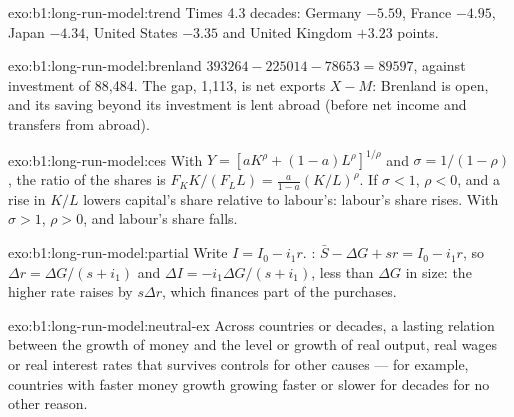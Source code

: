\begin{solution}{exo:b1:long-run-model:trend}
Times 4.3 decades: Germany $-5.59$, France $-4.95$, Japan $-4.34$, United States
$-3.35$ and United Kingdom $+3.23$ points.
\end{solution}

\begin{solution}{exo:b1:long-run-model:brenland}
$393264 - 225014 - 78653 = 89597$, against investment of 88,484. The gap, 1,113, is
net exports $X - M$: Brenland is open, and its saving beyond its investment
is lent abroad (before net income and transfers from abroad).
\end{solution}

\begin{solution}{exo:b1:long-run-model:ces}
With $Y = [aK^{\rho} + (1 - a)L^{\rho}]^{1/\rho}$ and $\sigma = 1/(1 - \rho)$, the ratio of the shares is
$F_K K/(F_L L) = \frac{a}{1 - a}(K/L)^{\rho}$. If $\sigma < 1$, $\rho < 0$, and a rise in $K/L$ lowers capital's
share relative to labour's: labour's share rises. With $\sigma > 1$, $\rho > 0$, and
labour's share falls.
\end{solution}

\begin{solution}{exo:b1:long-run-model:partial}
Write $I = I_0 - i_1r$. : $\bar S - \Delta G + sr = I_0 - i_1r$, so $\Delta r = \Delta G/(s + i_1)$
and $\Delta I = -i_1\Delta G/(s + i_1)$, less than $\Delta G$ in size: the higher rate raises  by $s\Delta r$, which finances part of the purchases.
\end{solution}

\begin{solution}{exo:b1:long-run-model:neutral-ex}
Across countries or decades, a lasting relation between the growth of
money and the level or growth of real output, real wages or real interest
rates that survives controls for other causes --- for example, countries
with faster money growth growing faster or slower for decades for no other
reason.
\end{solution}

